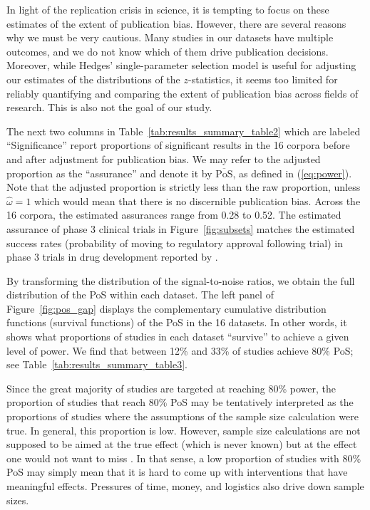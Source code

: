 \documentclass[11pt]{article}
\begin{document}
In light of the replication crisis in science, it is tempting to focus on these estimates of the extent of publication bias. However, there are several reasons why we must be very cautious. Many studies in our datasets have multiple outcomes, and we do not know which of them drive publication decisions. Moreover, while Hedges' single-parameter selection model is useful for adjusting our estimates of the distributions of the $z$-statistics, it seems too limited for reliably quantifying and comparing the extent of publication bias across fields of research. This is also not the goal of our study.

The next two columns in Table~\ref{tab:results_summary_table2} which are labeled ``Significance'' report proportions of significant results in the 16 corpora before and after adjustment for publication bias. We may refer to the adjusted proportion as the ``assurance'' and denote it by $\overline{\text{PoS}}$, as defined in (\ref{eq:power}).  Note that the adjusted proportion is strictly less than the raw proportion, unless $\hat{\omega}=1$ which would mean that there is no discernible publication bias. Across the 16 corpora, the estimated assurances range from 0.28 to 0.52. The estimated assurance of phase 3 clinical trials in Figure~\ref{fig:subsets} matches the estimated success rates (probability of moving to regulatory approval following trial) in phase 3 trials in drug development reported by \textcite{thomas2021clinicaldevelopment}.

By transforming the distribution of the signal-to-noise ratios, we obtain the full distribution of the PoS within each dataset. The left panel of Figure~\ref{fig:pos_gap} displays the complementary cumulative distribution functions (survival functions) of the PoS in the 16 datasets. In other words, it shows what proportions of studies in each dataset ``survive'' to achieve a given level of power. We find that between 12\% and 33\% of studies achieve 80\% PoS; see Table~\ref{tab:results_summary_table3}.

Since the great majority of studies are targeted at reaching 80\% power, the proportion of studies that reach 80\% PoS may be tentatively interpreted as the proportions of studies where the assumptions of the sample size calculation were true. In general, this proportion is low. However, sample size calculations are not supposed to be aimed at the true effect (which is never known) but at the effect one would not want to miss \parencite{senn2002cross}. In that sense, a low proportion of studies with 80\% PoS may simply mean that it is hard to come up with interventions that have meaningful effects. Pressures of time, money, and logistics also drive down sample sizes.  
\end{document}

